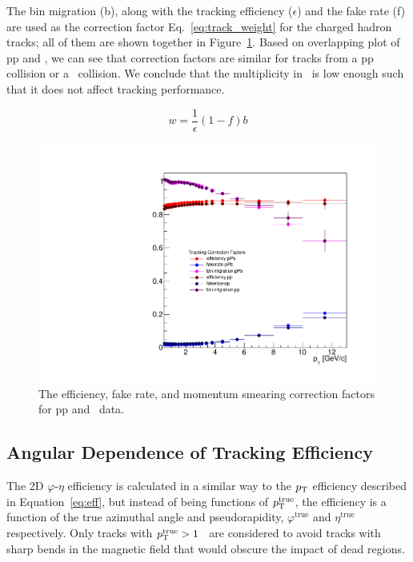 The bin migration (b), along with the tracking efficiency ($\epsilon$) and the fake rate (f) are used as the correction factor Eq.~\ref{eq:track_weight} for the charged hadron tracks; all of them are shown together in Figure~\ref{fig:correctionFactors}. Based on overlapping plot of pp and \pPb, we can see that correction factors are similar for tracks from a pp collision or a \pPb~collision. We conclude that the multiplicity in \pPb~is low enough such that it does not affect tracking performance.  

\begin{equation}\label{eq:track_weight}
w = \frac{1}{\epsilon}(1-f)b
\end{equation}

\begin{figure}[h]
\center
\includegraphics[width=.7\textwidth]{Data_Analysis/Tracking/trackCorrectionFactors_pPbAndpp.pdf}
\caption{The efficiency, fake rate, and momentum smearing correction factors for pp and \pPb~data.}
\label{fig:correctionFactors}
\end{figure}

\FloatBarrier

\subsection{Angular Dependence of Tracking Efficiency}
The 2D $\varphi$-$\eta$ efficiency is calculated in a similar way to the $p_{\mathrm{T}}$ efficiency described in Equation~\ref{eq:eff}, but instead of being functions of $p_{\mathrm{T}}^{\mathrm{true}}$, the efficiency is a function of the true azimuthal angle and pseudorapidity, $\varphi^{\mathrm{true}}$ and $\eta^{\mathrm{true}}$ respectively. Only tracks with {$p_{\mathrm{T}}^{\mathrm{true}}>1$} \GeVc~are considered to avoid tracks with sharp bends in the magnetic field that would obscure the impact of dead regions.

